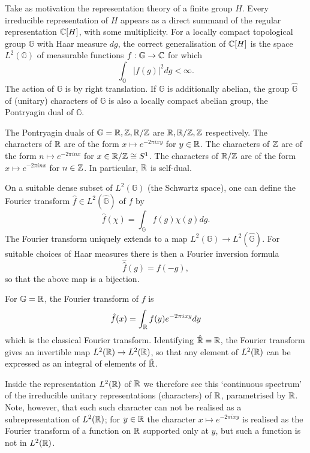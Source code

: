 Take as motivation the representation theory of a finite group $H$. Every irreducible representation of $H$ appears as a direct summand of the regular representation $\mathbb{C}[H]$, with some multiplicity. For a locally compact topological group $\mathbb G$ with Haar measure $dg$, the correct generalisation of $\mathbb{C}[H]$ is the space $L^2(\mathbb G)$ of measurable functions $f:\mathbb G \to \mathbb{C}$ for which 
$$\int_{\mathbb G} |f(g)|^2 dg < \infty.$$
The action of $\mathbb G$ is by right translation. If $\mathbb G$ is additionally abelian, the group $\hat{\mathbb G}$ of (unitary) characters of $\mathbb G$ is also a locally compact abelian group, the Pontryagin dual of $\mathbb G$. 

\begin{example}
    The Pontryagin duals of $\mathbb G = \mathbb{R}, \mathbb{Z}, \mathbb{R}/\mathbb{Z}$ are $\mathbb{R}, \mathbb{R}/\mathbb{Z}, \mathbb{Z}$ respectively. The characters of $\mathbb{R}$ are of the form $x \mapsto e^{-2\pi i xy}$ for $y \in \mathbb{R}$. The characters of $\mathbb{Z}$ are of the form $n \mapsto e^{-2\pi i nx}$ for $x \in \mathbb{R}/\mathbb{Z} \cong S^1$. The characters of $\mathbb{R}/\mathbb{Z}$ are of the form $x \mapsto e^{-2\pi i nx}$ for $n \in \mathbb{Z}$. In particular, $\mathbb{R}$ is self-dual.
\end{example}

On a suitable dense subset of $L^2(\mathbb G)$ (the Schwartz space), one can define the Fourier transform $\hat{f} \in L^2(\hat{\mathbb G})$ of $f$ by
$$\hat{f}(\chi) = \int_{\mathbb G} f(g)\chi(g) dg.$$
The Fourier transform uniquely extends to a map $L^2(\mathbb G) \to L^2(\hat{\mathbb G})$. For suitable choices of Haar measures there is then a Fourier inversion formula 
$$\hat{\hat{f}}(g)=f(-g),$$ so that the above map is a bijection.

\begin{example}
    For $\mathbb G=\mathbb{R}$, the Fourier transform of $f$ is 
    $$\hat{f}(x) = \int_{\mathbb{R}} f(y)e^{-2\pi i xy} dy$$
    which is the classical Fourier transform. Identifying $\hat{\mathbb{R}} = \mathbb{R}$, the Fourier transform gives an invertible map $L^2(\mathbb{R}) \to L^2(\mathbb{R})$, so that any element of $L^2(\mathbb{R})$ can be expressed as an integral of elements of $\hat{\mathbb{R}}$. 

    Inside the representation $L^2(\mathbb{R})$ of $\mathbb{R}$ we therefore see this `continuous spectrum' of the irreducible unitary representations (characters) of $\mathbb{R}$, parametrised by $\mathbb{R}$. Note, however, that each such character can not be realised as a subrepresentation of $L^2(\mathbb{R})$; for $y \in \mathbb{R}$ the character $x \mapsto e^{-2\pi i xy}$ is realised as the Fourier transform of a function on $\mathbb{R}$ supported only at $y$, but such a function is not in $L^2(\mathbb{R})$.
\end{example}

